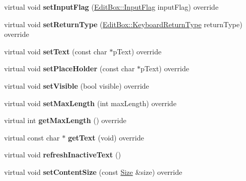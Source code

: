 \begin{DoxyCompactItemize}
virtual void {\bfseries set\+Input\+Flag} (\hyperlink{classui_1_1EditBox_af02f13ee9fba51d59bb3111e200848c8}{Edit\+Box\+::\+Input\+Flag} input\+Flag) override
\item 
\mbox{\label{classui_1_1EditBoxImplCommon_abf38e50157dc90f33ee0bfc589b6dcc7}} 
virtual void {\bfseries set\+Return\+Type} (\hyperlink{classui_1_1EditBox_a1e1285b6f742975b26bdeb8108ca6e51}{Edit\+Box\+::\+Keyboard\+Return\+Type} return\+Type) override
\item 
\mbox{\label{classui_1_1EditBoxImplCommon_a14ecd375fd700c6c20f9e2ed54466682}} 
virtual void {\bfseries set\+Text} (const char $\ast$p\+Text) override
\item 
\mbox{\label{classui_1_1EditBoxImplCommon_a941b0dfa9cfabb6f5378e1447a89083e}} 
virtual void {\bfseries set\+Place\+Holder} (const char $\ast$p\+Text) override
\item 
\mbox{\label{classui_1_1EditBoxImplCommon_a52ec145d715aa5cb695773fd84e6cce6}} 
virtual void {\bfseries set\+Visible} (bool visible) override
\item 
\mbox{\label{classui_1_1EditBoxImplCommon_aa315d01d86a952518d37ca28fe3c1f7b}} 
virtual void {\bfseries set\+Max\+Length} (int max\+Length) override
\item 
\mbox{\label{classui_1_1EditBoxImplCommon_a6ad3d264052d1c02a750677df21a0252}} 
virtual int {\bfseries get\+Max\+Length} () override
\item 
\mbox{\label{classui_1_1EditBoxImplCommon_afc58cdd273b8a3c0119566fe8a6db729}} 
virtual const char $\ast$ {\bfseries get\+Text} (void) override
\item 
\mbox{\label{classui_1_1EditBoxImplCommon_a0a685c58cd4a43ce217d84b47ecd3231}} 
virtual void {\bfseries refresh\+Inactive\+Text} ()
\item 
\mbox{\label{classui_1_1EditBoxImplCommon_ae5cd438166a753ff891b2b86d2ac98f6}} 
virtual void {\bfseries set\+Content\+Size} (const \hyperlink{classSize}{Size} \&size) override

\end{DoxyCompactItemize}
